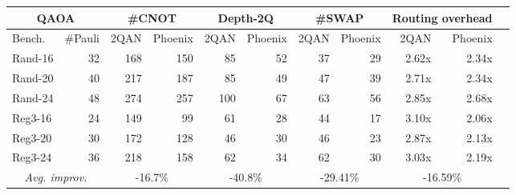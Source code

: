 \begin{tabular}{|l|r|r|r|r|r|r|r|r|r|r|}
    \hline
    \multicolumn{2}{|c|}{\textbf{QAOA}} & \multicolumn{2}{c|}{\textbf{\#CNOT}} & \multicolumn{2}{c|}{\textbf{Depth-2Q}} & \multicolumn{2}{c|}{\textbf{\#SWAP}} & \multicolumn{2}{c|}{\textbf{Routing overhead}} \\ 
    \hline
    Bench. &  \#Pauli & 2QAN & Phoenix & 2QAN & Phoenix & 2QAN & Phoenix & 2QAN & Phoenix \\
    \hline
    Rand-16 & 32 & 168 & 150 & 85 & 52 & 37 & 29 & 2.62x & 2.34x \\
    \hline
    Rand-20 &  40 & 217 & 187 & 85 & 49 & 47 & 39 & 2.71x & 2.34x \\
    \hline
    Rand-24 &  48 & 274 & 257 & 100 & 67 & 63 & 56 & 2.85x & 2.68x \\
    \hline
    Reg3-16 &  24 & 149 & 99 & 61 & 28 & 44 & 17 & 3.10x & 2.06x \\
    \hline
    Reg3-20 &  30 & 172 & 128 & 46 & 30 & 46 & 23 & 2.87x & 2.13x \\
    \hline
    Reg3-24 &  36 & 218 & 158 & 62 & 34 & 62 & 30 & 3.03x & 2.19x \\
    \hline
    \multicolumn{2}{|c|}{\emph{Avg. improv.}} & \multicolumn{2}{c|}{-16.7\%} & \multicolumn{2}{c|}{-40.8\%} & \multicolumn{2}{c|}{-29.41\%} & \multicolumn{2}{c|}{-16.59\%} \\
    \hline
\end{tabular}
    